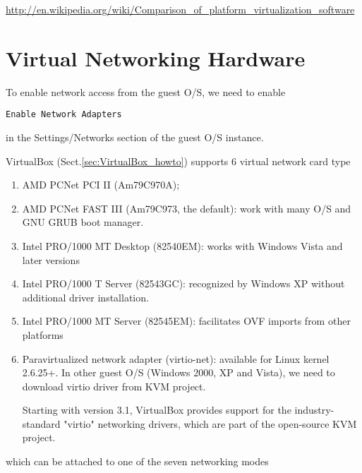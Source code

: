 \url{http://en.wikipedia.org/wiki/Comparison_of_platform_virtualization_software}

\section{Virtual Networking Hardware}
\label{sec:virtual_networking}

To enable network access from the guest O/S, we need to enable
\begin{verbatim}
Enable Network Adapters
\end{verbatim}
in the Settings/Networks section of the guest O/S instance.

VirtualBox (Sect.\ref{sec:VirtualBox_howto}) supports 6 virtual network
card type
\begin{enumerate}
  \item AMD PCNet PCI II (Am79C970A);

  \item AMD PCNet FAST III (Am79C973, the default): work with many O/S and GNU
  GRUB boot manager.

  \item Intel PRO/1000 MT Desktop (82540EM): works with Windows Vista and later
  versions

  \item Intel PRO/1000 T Server (82543GC): recognized by Windows XP without
  additional driver installation.

  \item Intel PRO/1000 MT Server (82545EM): facilitates OVF imports from other
  platforms

  \item Paravirtualized network adapter (virtio-net): available for Linux kernel
  2.6.25+. In other guest O/S (Windows 2000, XP and Vista), we need to download
  virtio driver from KVM project.
  
  Starting with version 3.1, VirtualBox provides support for the
  industry-standard "virtio" networking drivers, which are part of the
  open-source KVM project. 
\end{enumerate}
which can be attached to one of the seven networking modes
